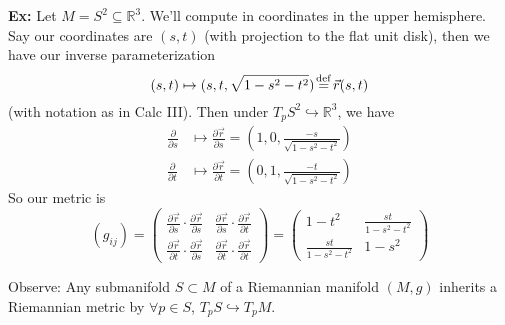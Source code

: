 \documentclass[10pt,letterpaper]{article}
\newcommand{\n}{\hfill\break}
\newcommand{\hangblock}[2]{\par\noindent\settowidth{\hangindent}{\textbf{#1: }}\textbf{#1: }\nolinebreak#2}
\newcommand{\ex}[1]{\hangblock{Ex}{#1}}
\newcommand{\ptxt}[1]{\textrm{\textnormal{#1}}}
\newcommand{\reals}{\mathbb{R}}
\newcommand{\R}{\reals}
\newcommand{\pd}[2]{\frac{\partial{}#1}{\partial{}#2}}
\newcommand{\labeledeq}[1]{\overset{\mathclap{\ptxt{#1}}}{=}}
\newcommand{\eqdef}{\labeledeq{def}}
\newcommand{\paren}[1]{\left(#1\right)}
\begin{document}
\ex{
	Let $M=S^{2}\subseteq\R^{3}$. We'll compute in coordinates in the upper hemisphere. Say our coordinates are $(s,t)$ (with projection to the flat unit disk), then we have our inverse parameterization
	\[
		(s,t)\mapsto(s,t,\sqrt{1-s^{2}-t^{2}})\eqdef\vec{r}(s,t)
	\]
	(with notation as in Calc III). Then under $T_{p}S^{2}\hookrightarrow\R^{3}$, we have
	\begin{align*}
		\pd{}{s} & \mapsto\pd{\vec{r}}{s}=\paren{1,0,\frac{-s}{\sqrt{1-s^{2}-t^{2}}}}\\
		\pd{}{t} & \mapsto\pd{\vec{r}}{t}=\paren{0,1,\frac{-t}{\sqrt{1-s^{2}-t^{2}}}}
	\end{align*}
	So our metric is
	\[
		(g_{ij})=\begin{pmatrix}
			\pd{\vec{r}}{s}\cdot\pd{\vec{r}}{s} & \pd{\vec{r}}{s}\cdot\pd{\vec{r}}{t}\\
			\pd{\vec{r}}{t}\cdot\pd{\vec{r}}{s} & \pd{\vec{r}}{t}\cdot\pd{\vec{r}}{t}
		\end{pmatrix}=\begin{pmatrix}
			1-t^{2} & \frac{st}{1-s^{2}-t^{2}}\\
			\frac{st}{1-s^{2}-t^{2}} & 1-s^{2}
		\end{pmatrix}
	\]
	\n
}

\par\noindent
Observe: Any submanifold $S\subset{}M$ of a Riemannian manifold $(M,g)$ inherits a Riemannian metric by $\forall{}p\in{}S$, $T_{p}S\hookrightarrow{}T_{p}M$.\n
\end{document}
